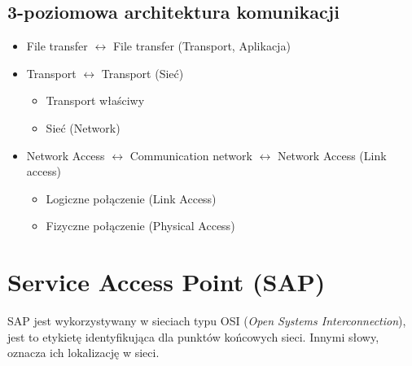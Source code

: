 		\subsection{3-poziomowa architektura komunikacji}
			\begin{itemize}
				\item File transfer $\longleftrightarrow$ File transfer (Transport, Aplikacja)
				\item Transport $\longleftrightarrow$ Transport (Sieć)
				\begin{itemize}
					\item Transport właściwy
					\item Sieć (Network)
				\end{itemize}
				\item Network Access $\longleftrightarrow$ Communication network
				 $\longleftrightarrow$ Network Access (Link access)
				 \begin{itemize}
				 	\item Logiczne połączenie (Link Access)
				 	\item Fizyczne połączenie (Physical Access)
				 \end{itemize}
			\end{itemize}
	\section{Service Access Point (SAP)}
		SAP jest wykorzystywany w sieciach typu OSI (\emph{Open Systems Interconnection}), jest to etykietę identyfikująca dla punktów końcowych sieci. Innymi słowy, oznacza ich lokalizację w sieci.
